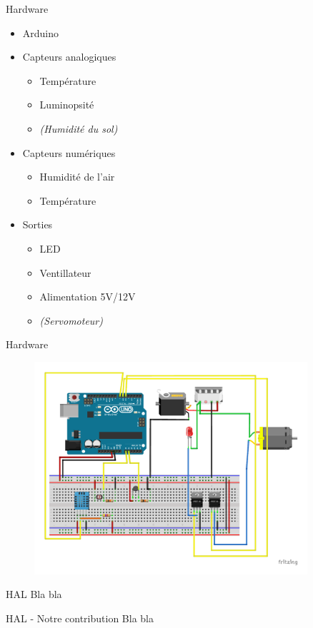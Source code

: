\documentclass{beamer}
\begin{document}
        \begin{frame}{Hardware}
            \begin{itemize}
                \item Arduino
                \item Capteurs analogiques
                    \begin{itemize}
                        \item Température
                        \item Luminopsité
                        \item \textit{(Humidité du sol)}
                    \end{itemize}
                \item Capteurs numériques
                    \begin{itemize}
                        \item Humidité de l'air
                        \item Température
                    \end{itemize}
                \item Sorties
                    \begin{itemize}
                        \item LED
                        \item Ventillateur
                        \item Alimentation 5V/12V
                        \item \textit{(Servomoteur)}
                    \end{itemize}
            \end{itemize}
        \end{frame}

		\begin{frame}{Hardware}
			\begin{figure}
                \centering
                \includegraphics[width = 0.9\textwidth]{hardware.pdf}
            \end{figure}
		\end{frame}

		\begin{frame}{HAL}
			Bla bla
		\end{frame}

		\begin{frame}{HAL - Notre contribution}
			Bla bla
		\end{frame}
\end{document}
